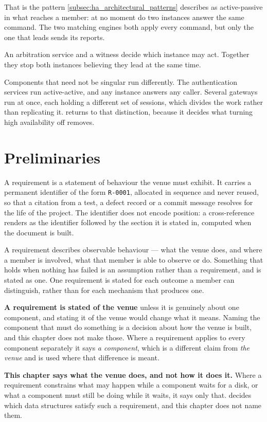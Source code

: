 That is the pattern \cref{subsec:ha_architectural_patterns} describes as
active-passive in what reaches a member: at no moment do two instances answer the
same command. The two matching engines both apply every command, but only the
one that leads sends its reports.

An arbitration service and a witness decide which instance may act. Together they
stop both instances believing they lead at the same time.

Components that need not be singular run differently. The authentication
services run active-active, and any instance answers any caller. Several
gateways run at once, each holding a different set of sessions, which divides
the work rather than replicating it.  returns to
that distinction, because it decides what turning high availability off
removes.

\section{Preliminaries}
\label{sec:ha:preliminaries}

A requirement is a statement of behaviour the venue must exhibit. It carries a
permanent identifier of the form \texttt{R-0001}, allocated in sequence and
never reused, so that a citation from a test, a defect record or a commit
message resolves for the life of the project. The identifier does not encode
position: a cross-reference renders as the identifier followed by the section it
is stated in, computed when the document is built.

A requirement describes observable behaviour --- what the venue does, and where
a member is involved, what that member is able to observe or do. Something that
holds when nothing has failed is an assumption rather than a requirement, and is
stated as one. One requirement is stated for each outcome a member can
distinguish, rather than for each mechanism that produces one.

\textbf{A requirement is stated of the venue} unless it is genuinely about one
component, and stating it of the venue would change what it means.
Naming the component that must do something is a decision about how the venue is
built, and this chapter does not make those. Where a requirement applies to every
component separately it says \emph{a component}, which is a different claim from
\emph{the venue} and is used where that difference is meant.

\textbf{This chapter says what the venue does, and not how it does it.} Where a
requirement constrains what may happen while a component waits for a disk, or
what a component must still be doing while it waits, it says only that.
 decides which data structures satisfy such a requirement, and
this chapter does not name them.

